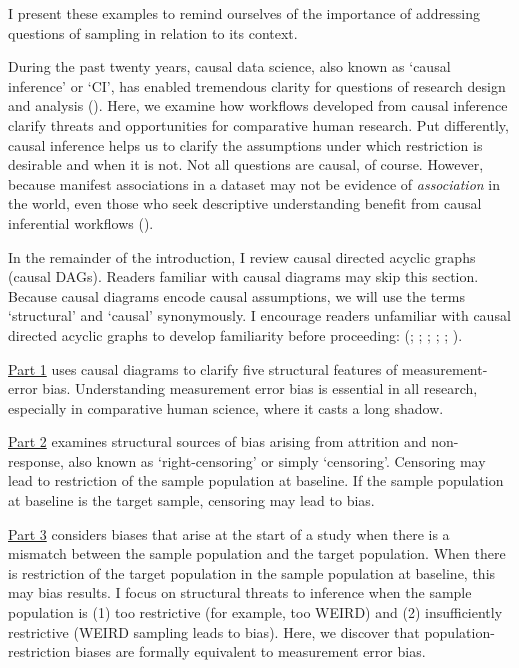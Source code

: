 \documentclass[
  single column]{article}
\begin{document}
I present these examples to remind ourselves of the importance of
addressing questions of sampling in relation to its context.

During the past twenty years, causal data science, also known as `causal
inference' or `CI', has enabled tremendous clarity for questions of
research design and analysis
().
Here, we examine how workflows developed from causal inference clarify
threats and opportunities for comparative human research. Put
differently, causal inference helps us to clarify the assumptions under
which restriction is desirable and when it is not. Not all questions are
causal, of course. However, because manifest associations in a dataset
may not be evidence of \emph{association} in the world, even those who
seek descriptive understanding benefit from causal inferential workflows
().

In the remainder of the introduction, I review causal directed acyclic
graphs (causal DAGs). Readers familiar with causal diagrams may skip
this section. Because causal diagrams encode causal assumptions, we will
use the terms `structural' and `causal' synonymously. I encourage
readers unfamiliar with causal directed acyclic graphs to develop
familiarity before proceeding: (; ;
;
;
;
).

\hyperref[id-sec-1]{Part 1} uses causal diagrams to clarify five
structural features of measurement-error bias. Understanding measurement
error bias is essential in all research, especially in comparative human
science, where it casts a long shadow.

\hyperref[id-sec-2]{Part 2} examines structural sources of bias arising
from attrition and non-response, also known as `right-censoring' or
simply `censoring'. Censoring may lead to restriction of the sample
population at baseline. If the sample population at baseline is the
target sample, censoring may lead to bias.

\hyperref[id-sec-3]{Part 3} considers biases that arise at the start of
a study when there is a mismatch between the sample population and the
target population. When there is restriction of the target population in
the sample population at baseline, this may bias results. I focus on
structural threats to inference when the sample population is (1) too
restrictive (for example, too WEIRD) and (2) insufficiently restrictive
(WEIRD sampling leads to bias). Here, we discover that
population-restriction biases are formally equivalent to measurement
error bias.
\end{document}
